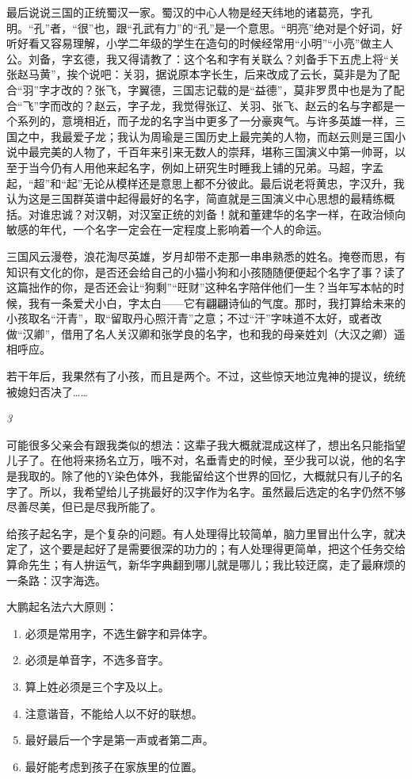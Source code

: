 \documentclass[twoside,openright,headings=optiontohead]{ctexbook} %
\providecommand{\tightlist}{%
   \setlength{\itemsep}{0pt}\setlength{\parskip}{0pt}}
\begin{document}
{最后说说三国的正统蜀汉一家。蜀汉的中心人物是经天纬地的诸葛亮，字孔明。``孔''者，``很''也，跟``孔武有力''的``孔''是一个意思。``明亮''绝对是个好词，好听好看又容易理解，小学二年级的学生在造句的时候经常用``小明''``小亮''做主人公。刘备，字玄德，我又得请教了：这个名和字有关联么？刘备手下五虎上将``关张赵马黄''，挨个说吧：关羽，据说原本字长生，后来改成了云长，莫非是为了配合``羽''字才改的？张飞，字翼德，三国志记载的是``益德''，莫非罗贯中也是为了配合``飞''字而改的？赵云，字子龙，我觉得张辽、关羽、张飞、赵云的名与字都是一个系列的，意境相近，而子龙的名字当中更多了一分豪爽气。与许多英雄一样，三国之中，我最爱子龙；我认为周瑜是三国历史上最完美的人物，而赵云则是三国小说中最完美的人物了，千百年来引来无数人的崇拜，堪称三国演义中第一帅哥，以至于当今仍有人用他来起名字，例如上研究生时睡我上铺的兄弟。马超，字孟起，``超''和``起''无论从模样还是意思上都不分彼此。最后说老将黄忠，字汉升，我认为这是三国群英谱中起得最好的名字，简直就是三国演义中心思想的最精练概括。对谁忠诚？对汉朝，对汉室正统的刘备！就和董建华的名字一样，在政治倾向敏感的年代，一个名字一定会在一定程度上影响着一个人的命运。

三国风云漫卷，浪花淘尽英雄，岁月却带不走那一串串熟悉的姓名。掩卷而思，有知识有文化的你，是否还会给自己的小猫小狗和小孩随随便便起个名字了事？读了这篇拙作的你，是否还会让``狗剩''``旺财''这种名字陪伴他们一生？当年写本帖的时候，我有一条爱犬小白，字太白------它有翩翩诗仙的气度。那时，我打算给未来的小孩取名``汗青''，取``留取丹心照汗青''之意；不过``汗''字味道不太好，或者改做``汉卿''，借用了名人关汉卿和张学良的名字，也和我的母亲姓刘（大汉之卿）遥相呼应。

若干年后，我果然有了小孩，而且是两个。不过，这些惊天地泣鬼神的提议，统统被媳妇否决了\ldots{}\ldots{}

\emph{3}

可能很多父亲会有跟我类似的想法：这辈子我大概就混成这样了，想出名只能指望儿子了。在他将来扬名立万，哦不对，名垂青史的时候，至少我可以说，他的名字是我取的。除了他的Y染色体外，我能留给这个世界的回忆，大概就只有儿子的名字了。所以，我希望给儿子挑最好的汉字作为名字。虽然最后选定的名字仍然不够尽善尽美，但已是尽我所能了。

给孩子起名字，是个复杂的问题。有人处理得比较简单，脑力里冒出什么字，就决定了，这个要是起好了是需要很深的功力的；有人处理得更简单，把这个任务交给算命先生；有人拚运气，新华字典翻到哪儿就是哪儿；我比较迂腐，走了最麻烦的一条路：汉字海选。

大鹏起名法六大原则：

\begin{enumerate}
\def\labelenumi{\arabic{enumi}.}
\tightlist
\item
  必须是常用字，不选生僻字和异体字。
\item
  必须是单音字，不选多音字。
\item
  算上姓必须是三个字及以上。
\item
  注意谐音，不能给人以不好的联想。
\item
  最好最后一个字是第一声或者第二声。
\item
  最好能考虑到孩子在家族里的位置。
\end{enumerate}

}
\end{document}
